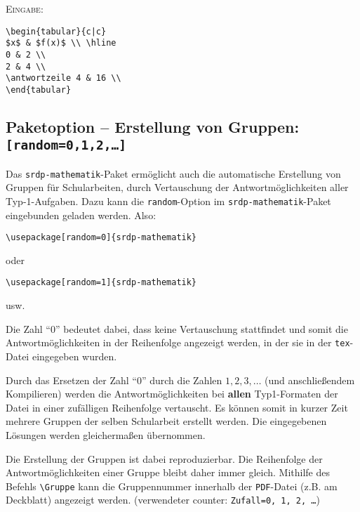 \documentclass[a4paper,12pt]{article}
\begin{document}
\textsc{Eingabe:}

\begin{verbatim}
\begin{tabular}{c|c}
$x$ & $f(x)$ \\ \hline
0 & 2 \\
2 & 4 \\
\antwortzeile 4 & 16 \\
\end{tabular}
\end{verbatim}


\subsection{Paketoption -- Erstellung von Gruppen: \texttt{[random=0,1,2,\ldots]}}
Das \texttt{srdp-mathematik}-Paket ermöglicht auch die automatische Erstellung von Gruppen für Schularbeiten, durch Vertauschung der Antwortmöglichkeiten aller Typ-1-Aufgaben. Dazu kann die \texttt{random}-Option im \texttt{srdp-mathematik}-Paket eingebunden geladen werden. Also:

\begin{verbatim}
\usepackage[random=0]{srdp-mathematik}
\end{verbatim}

oder

\begin{verbatim}
\usepackage[random=1]{srdp-mathematik}
\end{verbatim}

usw.

Die Zahl "`0"' bedeutet dabei, dass keine Vertauschung stattfindet und somit die Antwortmöglichkeiten in der Reihenfolge angezeigt werden, in der sie in der \texttt{tex}-Datei eingegeben wurden. 

Durch das Ersetzen der Zahl "`0"' durch die Zahlen $1, 2, 3, \ldots$ (und anschließendem Kompilieren) werden die Antwortmöglichkeiten bei \textbf{allen} Typ1-Formaten der Datei in einer zufälligen Reihenfolge vertauscht. Es können somit in kurzer Zeit mehrere Gruppen der selben Schularbeit erstellt werden. Die eingegebenen Lösungen werden gleichermaßen übernommen. \leer

Die Erstellung der Gruppen ist dabei reproduzierbar. Die Reihenfolge der Antwortmöglichkeiten einer Gruppe bleibt daher immer gleich. Mithilfe des Befehls \texttt{\textbackslash Gruppe} kann die Gruppennummer innerhalb der \texttt{PDF}-Datei (z.B. am Deckblatt) angezeigt werden. (verwendeter counter: \texttt{Zufall=0, 1, 2, \ldots})
\end{document}
